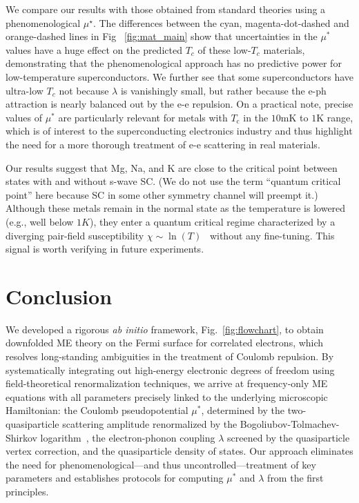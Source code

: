 \documentclass[%
 reprint,
superscriptaddress,
 amsmath,amssymb,
 aps,
prx,
]{revtex4-2}
\newcommand{\txc}{\text{c}}
\begin{document}
  
We compare our results with those obtained from standard theories using a phenomenological $\mu^\star$. The differences between the cyan, magenta-dot-dashed and orange-dashed lines in Fig ~\ref{fig:mat_main} show that uncertainties in the $\mu^*$ values have a huge effect on the predicted $T_c$  of these low-$T_c$  materials, demonstrating that the phenomenological approach has no predictive power for low-temperature superconductors. We further see that  some superconductors have ultra-low $T_c$ not because $\lambda$ is vanishingly small, but rather because the e-ph attraction is nearly balanced out by the e-e repulsion.
On a practical note, precise values of $\mu^*$ are particularly relevant for metals with $T_\txc$ in the $10 \text{mK}$ to $1 \text{K}$ range, which is of interest to the superconducting electronics industry and thus highlight the need for a more thorough treatment of e-e scattering in real materials.



Our results suggest that Mg, Na, and K are close to the 
critical point between states with and without s-wave SC.
(We do not use the term ``quantum critical point'' here because SC in some other symmetry channel will preempt it.) 
Although these metals remain in the normal state as the temperature is lowered (e.g., well below $1K$), they enter a quantum critical regime  characterized by a diverging pair-field susceptibility $\chi \sim \ln (T)$~\cite{pengcheng} without any fine-tuning.  
This signal is worth verifying in future experiments.



\section{Conclusion}

We developed a rigorous {\it ab initio} framework, Fig.~\ref{fig:flowchart}, to obtain downfolded ME theory on the Fermi surface for correlated electrons, which resolves long-standing ambiguities in the treatment of Coulomb repulsion. By systematically integrating out high-energy electronic degrees of freedom using field-theoretical renormalization techniques, we arrive at frequency-only ME equations with all parameters precisely linked to the underlying microscopic Hamiltonian: the Coulomb pseudopotential $\mu^*$, determined by the two-quasiparticle scattering amplitude renormalized by the
Bogoliubov-Tolmachev-Shirkov logarithm~\cite{bogoliubov59,tolmachev1961logarithmic}, the electron-phonon coupling $\lambda$ screened by the quasiparticle vertex correction,
and the quasiparticle density of states.
Our approach eliminates the need for phenomenological---and thus uncontrolled---treatment of key parameters and establishes protocols for computing 
$\mu^*$ and $\lambda$ from the first principles.
\end{document}
